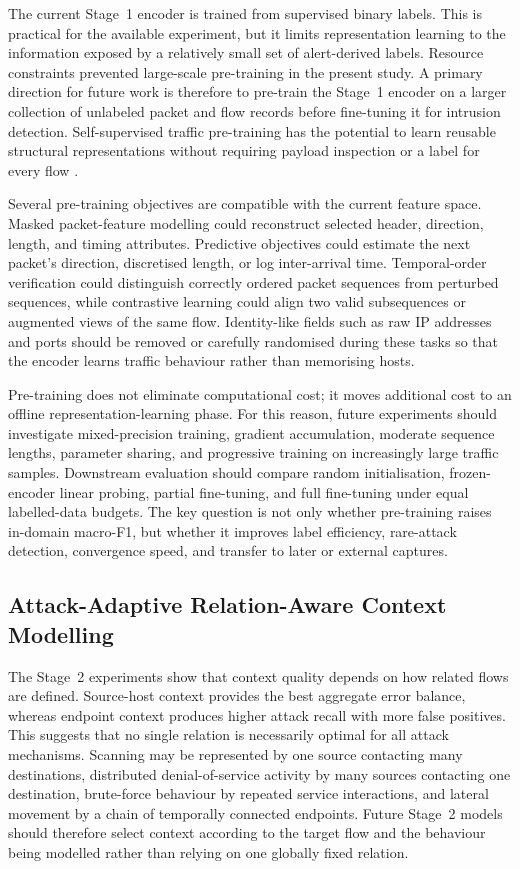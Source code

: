 \documentclass[11pt,fleqn]{report}
\begin{document}
The current Stage~1 encoder is trained from supervised binary labels. This is practical for the available experiment, but it limits representation learning to the information exposed by a relatively small set of alert-derived labels. Resource constraints prevented large-scale pre-training in the present study. A primary direction for future work is therefore to pre-train the Stage~1 encoder on a larger collection of unlabeled packet and flow records before fine-tuning it for intrusion detection. Self-supervised traffic pre-training has the potential to learn reusable structural representations without requiring payload inspection or a label for every flow
\cite{2024MAETraffic,Dong2025EncryptedPretrain}.

Several pre-training objectives are compatible with the current feature space. Masked packet-feature modelling could reconstruct selected header, direction, length, and timing attributes. Predictive objectives could estimate the next packet's direction, discretised length, or log inter-arrival time. Temporal-order verification could distinguish correctly ordered packet sequences from perturbed sequences, while contrastive learning could align two valid subsequences or augmented views of the same flow. Identity-like fields such as raw IP addresses and ports should be removed or carefully randomised during these tasks so that the encoder learns traffic behaviour rather than memorising hosts.

Pre-training does not eliminate computational cost; it moves additional cost to an offline representation-learning phase. For this reason, future experiments should investigate mixed-precision training, gradient accumulation, moderate sequence lengths, parameter sharing, and progressive training on increasingly large traffic samples. Downstream evaluation should compare random initialisation, frozen-encoder linear probing, partial fine-tuning, and full fine-tuning under equal labelled-data budgets. The key question is not only whether pre-training raises in-domain macro-F1, but whether it improves label efficiency, rare-attack detection, convergence speed, and transfer to later or external captures.

\subsection{Attack-Adaptive Relation-Aware Context Modelling}
\label{subsubsec:future_relation_aware_context}

The Stage~2 experiments show that context quality depends on how related flows are defined. Source-host context provides the best aggregate error balance, whereas endpoint context produces higher attack recall with more false positives. This suggests that no single relation is necessarily optimal for all attack mechanisms. Scanning may be represented by one source contacting many destinations, distributed denial-of-service activity by many sources contacting one destination, brute-force behaviour by repeated service interactions, and lateral movement by a chain of temporally connected endpoints. Future Stage~2 models should therefore select context according to the target flow and the behaviour being modelled rather than relying on one globally fixed relation.
\end{document}
